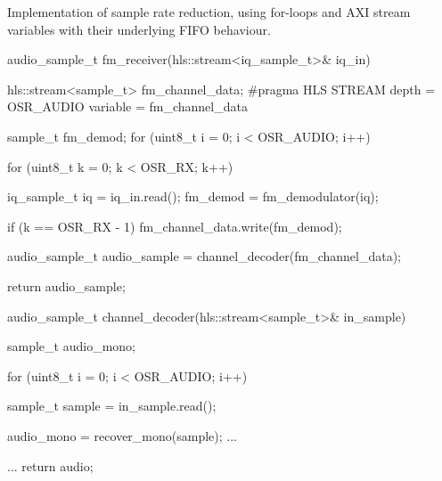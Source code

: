 \begin{program}
  \caption{Implementation of sample rate reduction, using for-loops and AXI stream variables with their underlying FIFO behaviour.}
  \label{prog:sample_rate_reduction_fifo_behaviour}
\begin{CppCode}
audio_sample_t fm_receiver(hls::stream<iq_sample_t>& iq_in) {

  hls::stream<sample_t> fm_channel_data;
  #pragma HLS STREAM depth = OSR_AUDIO variable = fm_channel_data

  sample_t fm_demod;
  for (uint8_t i = 0; i < OSR_AUDIO; i++) {
    for (uint8_t k = 0; k < OSR_RX; k++) {
      iq_sample_t iq = iq_in.read();
      fm_demod       = fm_demodulator(iq);

      if (k == OSR_RX - 1) {
        fm_channel_data.write(fm_demod);
      }
    }
  }

  audio_sample_t audio_sample = channel_decoder(fm_channel_data);

  return audio_sample;
}


audio_sample_t channel_decoder(hls::stream<sample_t>& in_sample) {
  sample_t audio_mono;

  for (uint8_t i = 0; i < OSR_AUDIO; i++) {
    sample_t sample = in_sample.read();

    audio_mono = recover_mono(sample);
    ...
  }
  ...
  return audio;
}
\end{CppCode}
\end{program}
